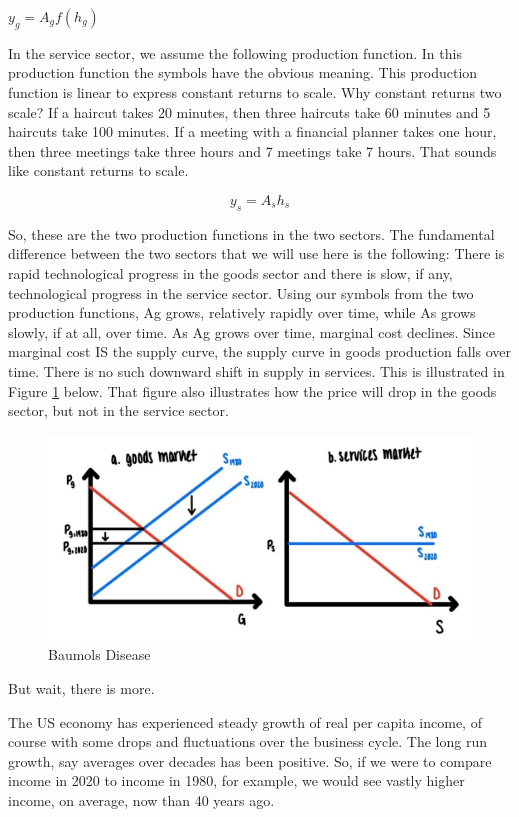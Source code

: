 \documentclass[
]{book}
\begin{document}
\(y_g = A_g f(h_g)\)

In the service sector, we assume the following production function. In this production function the symbols have the obvious meaning. This production function is linear to express constant returns to scale. Why constant returns two scale? If a haircut takes 20 minutes, then three haircuts take 60 minutes and 5 haircuts take 100 minutes. If a meeting with a financial planner takes one hour, then three meetings take three hours and 7 meetings take 7 hours. That sounds like constant returns to scale.

\[y_s = A_s h_s\]

So, these are the two production functions in the two sectors. The fundamental difference between the two sectors that we will use here is the following:
There is rapid technological progress in the goods sector and there is slow, if any, technological progress in the service sector. Using our symbols from the two production functions, Ag grows, relatively rapidly over time, while As grows slowly, if at all, over time. As Ag grows over time, marginal cost declines. Since marginal cost IS the supply curve, the supply curve in goods production falls over time. There is no such downward shift in supply in services. This is illustrated in Figure \ref{fig:compmarkets12} below. That figure also illustrates how the price will drop in the goods sector, but not in the service sector.

\begin{figure}

{\centering \includegraphics[width=1\linewidth]{img/compmarkets/fig12} 

}

\caption{Baumols Disease}\label{fig:compmarkets12}
\end{figure}

But wait, there is more.

The US economy has experienced steady growth of real per capita income, of course with some drops and fluctuations over the business cycle. The long run growth, say averages over decades has been positive. So, if we were to compare income in 2020 to income in 1980, for example, we would see vastly higher income, on average, now than 40 years ago.
\end{document}
